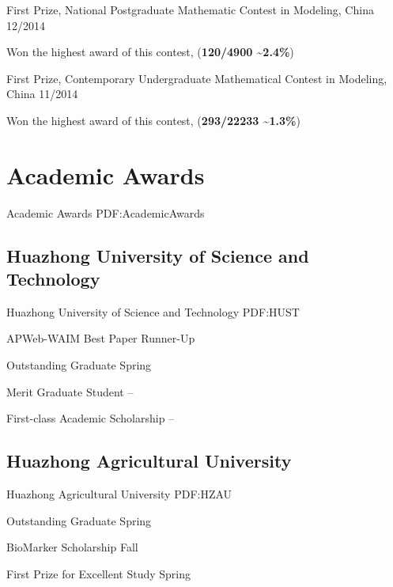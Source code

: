 \documentclass[letterpaper,10pt,oneside]{article}
\begin{document}
\begin{body}
\Gap
\BulletItem
First Prize, National Postgraduate Mathematic Contest in Modeling, China
\hfill
12/2014
\begin{detail}
\SubItem
Won the highest award of this contest, 
(\textbf{120/4900 \textasciitilde2.4\%}) 
\end{detail}

\Gap
\BulletItem
First Prize, Contemporary Undergraduate Mathematical Contest in Modeling, China
\hfill
11/2014
\begin{detail}
\SubItem
Won the highest award of this contest,
(\textbf{293/22233 \textasciitilde1.3\%})
\end{detail}


\section
{Academic Awards}
{Academic Awards}
{PDF:AcademicAwards}

\subsection
{Huazhong University of Science and Technology}
{Huazhong University of Science and Technology}
{PDF:HUST}
\GapNoBreak

\BulletItem
APWeb-WAIM Best Paper Runner-Up
\hfill
{}

\GapNoBreak

\BulletItem
Outstanding Graduate
\hfill
Spring 

\GapNoBreak

\BulletItem
Merit Graduate Student
\hfill
{} --

\GapNoBreak
\BulletItem
First-class Academic Scholarship
\hfill
{} --
\BigGap
\GapNoBreak
\subsection
{Huazhong Agricultural University}
{Huazhong Agricultural University}
{PDF:HZAU}

\BulletItem
Outstanding Graduate
\hfill
Spring 

\GapNoBreak
\BulletItem
BioMarker Scholarship 
\hfill
Fall 

\GapNoBreak
\BulletItem
First Prize for Excellent Study 
\hfill
Spring 


\end{body}
\end{document}
